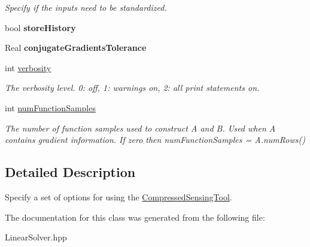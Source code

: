 \begin{DoxyCompactItemize}
\begin{DoxyCompactList}\small\item\em Specify if the inputs need to be standardized. \end{DoxyCompactList}\item 
bool {\bfseries store\+History}\label{classPecos_1_1CompressedSensingOptions_a67af0d64911c811dedcbe56adb978e18}

\item 
Real {\bfseries conjugate\+Gradients\+Tolerance}\label{classPecos_1_1CompressedSensingOptions_a7734271f72c9ee4835861e657cc250f8}

\item 
int \hyperlink{classPecos_1_1CompressedSensingOptions_a1bdcfae3209cbd96db35a2ae356fa15e}{verbosity}\label{classPecos_1_1CompressedSensingOptions_a1bdcfae3209cbd96db35a2ae356fa15e}

\begin{DoxyCompactList}\small\item\em The verbosity level. 0\+: off, 1\+: warnings on, 2\+: all print statements on. \end{DoxyCompactList}\item 
int \hyperlink{classPecos_1_1CompressedSensingOptions_a21e4bfae200b8fda9f18764d3c8a2c88}{num\+Function\+Samples}\label{classPecos_1_1CompressedSensingOptions_a21e4bfae200b8fda9f18764d3c8a2c88}

\begin{DoxyCompactList}\small\item\em The number of function samples used to construct A and B. Used when A contains gradient information. If zero then num\+Function\+Samples = A.\+num\+Rows() \end{DoxyCompactList}\end{DoxyCompactItemize}


\subsection{Detailed Description}
Specify a set of options for using the \hyperlink{classPecos_1_1CompressedSensingTool}{Compressed\+Sensing\+Tool}. 

The documentation for this class was generated from the following file\+:\begin{DoxyCompactItemize}
\item 
Linear\+Solver.\+hpp\end{DoxyCompactItemize}
